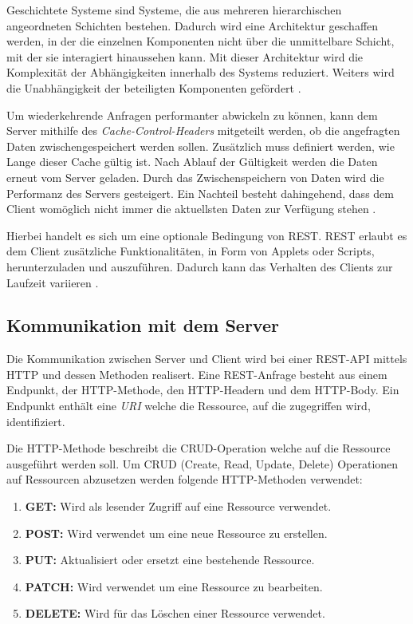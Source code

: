 Geschichtete Systeme sind Systeme, die aus mehreren hierarchischen angeordneten Schichten bestehen.
Dadurch wird eine Architektur geschaffen werden, in der die einzelnen Komponenten nicht über die unmittelbare Schicht, mit der sie interagiert hinaussehen kann.
Mit dieser Architektur wird die Komplexität der Abhängigkeiten innerhalb des Systems reduziert.
Weiters wird die Unabhängigkeit der beteiligten Komponenten gefördert \cite[S. 79]{fielding2000architectural}.

Um wiederkehrende Anfragen performanter abwickeln zu können, kann dem Server mithilfe des \textit{Cache-Control-Headers} mitgeteilt werden, ob die angefragten Daten zwischengespeichert werden sollen.
Zusätzlich muss definiert werden, wie Lange dieser Cache gültig ist.
Nach Ablauf der Gültigkeit werden die Daten erneut vom Server geladen.
Durch das Zwischenspeichern von Daten wird die Performanz des Servers gesteigert.
Ein Nachteil besteht dahingehend, dass dem Client womöglich nicht immer die aktuellsten Daten zur Verfügung stehen \cite[S. 79]{fielding2000architectural}.

Hierbei handelt es sich um eine optionale Bedingung von REST.
REST erlaubt es dem Client zusätzliche Funktionalitäten, in Form von Applets oder Scripts, herunterzuladen und auszuführen.
Dadurch kann das Verhalten des Clients zur Laufzeit variieren \cite[S. 84]{fielding2000architectural}.

\subsection{Kommunikation mit dem Server}
Die Kommunikation zwischen Server und Client wird bei einer REST-API mittels HTTP und dessen Methoden realisert.
Eine REST-Anfrage besteht aus einem Endpunkt, der HTTP-Methode, den HTTP-Headern und dem HTTP-Body.
Ein Endpunkt enthält eine \textit{URI} welche die Ressource, auf die zugegriffen wird, identifiziert.
\newline

Die HTTP-Methode beschreibt die CRUD-Operation welche auf die Ressource ausgeführt werden soll.
Um CRUD (Create, Read, Update, Delete) Operationen auf Ressourcen abzusetzen werden folgende HTTP-Methoden verwendet:
\begin{enumerate}
    \item \textbf{GET: }Wird als lesender Zugriff auf eine Ressource verwendet.
    \item \textbf{POST: }Wird verwendet um eine neue Ressource zu erstellen.
    \item \textbf{PUT: }Aktualisiert oder ersetzt eine bestehende Ressource.
    \item \textbf{PATCH: }Wird verwendet um eine Ressource zu bearbeiten.
    \item \textbf{DELETE: }Wird für das Löschen einer Ressource verwendet.
\end{enumerate}

